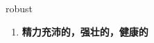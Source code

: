 
\begin{frame}
{\huge robust}
\begin{center}
\begin{enumerate}\Large
  \item \textbf{精力充沛的，强壮的，健康的}
\end{enumerate}
\end{center}
\end{frame}
